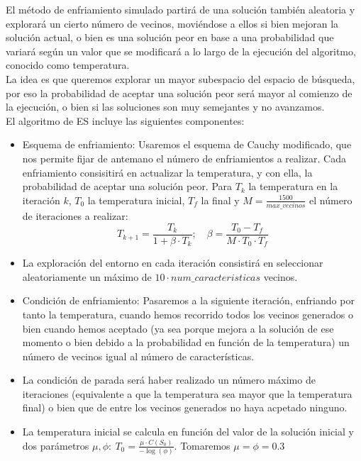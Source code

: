 \documentclass[11pt,leqno]{article}
\begin{document}
El método de enfriamiento simulado partirá de una solución también aleatoria y explorará un cierto número de vecinos, moviéndose a ellos si bien mejoran la solución actual, o bien es una solución peor en base a una probabilidad que variará según un valor que se modificará a lo largo de la ejecución del algoritmo, conocido como temperatura.\\
La idea es que queremos explorar un mayor subespacio del espacio de búsqueda, por eso la probabilidad de aceptar una solución peor será mayor al comienzo de la ejecución, o bien si las soluciones son muy semejantes y no avanzamos.\\
El algoritmo de ES incluye las siguientes componentes:
\begin{itemize}
\item Esquema de enfriamiento: Usaremos el esquema de Cauchy modificado, que nos permite fijar de antemano el número de enfriamientos a realizar. Cada enfriamiento consisitirá en actualizar la temperatura, y con ella, la probabilidad de aceptar una solución peor. Para $T_k$ la temperatura en la iteración $k$, $T_0$ la temperatura inicial, $T_f$ la final y $M=\frac{1500}{max\_vecinos}$ el número de iteraciones a realizar:
	\[ T_{k+1} = \frac{T_k}{1+\beta \cdot T_k};\quad \beta=\frac{T_0-T_f}{M \cdot T_0 \cdot T_f} \]
\item La exploración del entorno en cada iteración consistirá en seleccionar aleatoriamente un máximo de $10 \cdot num\_caracteristicas$ vecinos.
\item Condición de enfriamiento: Pasaremos a la siguiente iteración, enfriando por tanto la temperatura, cuando hemos recorrido todos los vecinos generados o bien cuando hemos aceptado (ya sea porque mejora a la solución de ese momento o bien debido a la probabilidad en función de la temperatura) un número de vecinos igual al número  de características.
\item La condición de parada será haber realizado un número máximo de iteraciones (equivalente a que la temperatura sea mayor que la temperatura final) o bien que de entre los vecinos generados no haya acpetado ninguno.
\item La temperatura inicial se calcula en función del valor de la solución inicial y dos parámetros $\mu,\phi:\ T_0 = \frac{\mu \cdot C(S_0)}{-\log(\phi)}$. Tomaremos $\mu=\phi=0.3$
\end{itemize}
\end{document}
